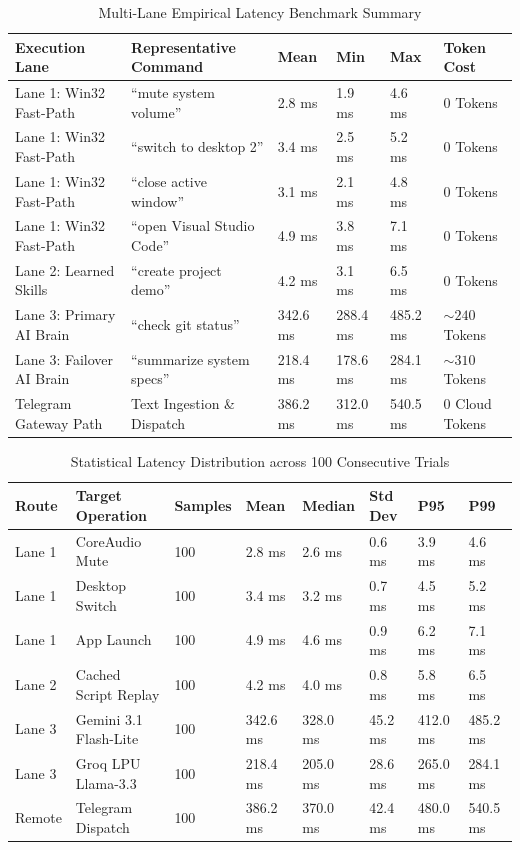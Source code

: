 \documentclass[12pt,letterpaper,oneside]{report}
\begin{document}
\begin{table}[H]
\centering
\caption{Multi-Lane Empirical Latency Benchmark Summary}
\label{tab:latency_benchmarks}
\begin{tabularx}{\textwidth}{|l|l|l|l|l|l|}
\hline
\textbf{Execution Lane} & \textbf{Representative Command} & \textbf{Mean} & \textbf{Min} & \textbf{Max} & \textbf{Token Cost}\\ \hline
Lane 1: Win32 Fast-Path & ``mute system volume'' & 2.8 ms & 1.9 ms & 4.6 ms & 0 Tokens\\ \hline
Lane 1: Win32 Fast-Path & ``switch to desktop 2'' & 3.4 ms & 2.5 ms & 5.2 ms & 0 Tokens\\ \hline
Lane 1: Win32 Fast-Path & ``close active window'' & 3.1 ms & 2.1 ms & 4.8 ms & 0 Tokens\\ \hline
Lane 1: Win32 Fast-Path & ``open Visual Studio Code'' & 4.9 ms & 3.8 ms & 7.1 ms & 0 Tokens\\ \hline
Lane 2: Learned Skills & ``create project demo'' & 4.2 ms & 3.1 ms & 6.5 ms & 0 Tokens\\ \hline
Lane 3: Primary AI Brain & ``check git status'' & 342.6 ms & 288.4 ms & 485.2 ms & $\sim 240$ Tokens\\ \hline
Lane 3: Failover AI Brain & ``summarize system specs'' & 218.4 ms & 178.6 ms & 284.1 ms & $\sim 310$ Tokens\\ \hline
Telegram Gateway Path & Text Ingestion \& Dispatch & 386.2 ms & 312.0 ms & 540.5 ms & 0 Cloud Tokens\\ \hline
\end{tabularx}
\end{table}

\begin{table}[H]
\centering
\caption{Statistical Latency Distribution across 100 Consecutive Trials}
\label{tab:statistical_distribution}
\begin{tabularx}{\textwidth}{|l|l|l|l|l|l|l|l|}
\hline
\textbf{Route} & \textbf{Target Operation} & \textbf{Samples} & \textbf{Mean} & \textbf{Median} & \textbf{Std Dev} & \textbf{P95} & \textbf{P99}\\ \hline
Lane 1 & CoreAudio Mute & 100 & 2.8 ms & 2.6 ms & 0.6 ms & 3.9 ms & 4.6 ms\\ \hline
Lane 1 & Desktop Switch & 100 & 3.4 ms & 3.2 ms & 0.7 ms & 4.5 ms & 5.2 ms\\ \hline
Lane 1 & App Launch & 100 & 4.9 ms & 4.6 ms & 0.9 ms & 6.2 ms & 7.1 ms\\ \hline
Lane 2 & Cached Script Replay & 100 & 4.2 ms & 4.0 ms & 0.8 ms & 5.8 ms & 6.5 ms\\ \hline
Lane 3 & Gemini 3.1 Flash-Lite & 100 & 342.6 ms & 328.0 ms & 45.2 ms & 412.0 ms & 485.2 ms\\ \hline
Lane 3 & Groq LPU Llama-3.3 & 100 & 218.4 ms & 205.0 ms & 28.6 ms & 265.0 ms & 284.1 ms\\ \hline
Remote & Telegram Dispatch & 100 & 386.2 ms & 370.0 ms & 42.4 ms & 480.0 ms & 540.5 ms\\ \hline
\end{tabularx}
\end{table}
\end{document}
